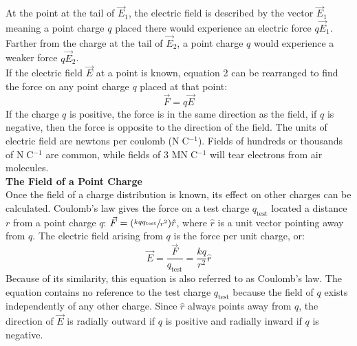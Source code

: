 \documentclass[a4paper]{article}
\let\bf\textbf
\begin{document}
At the point at the tail of $\vec{E}_1$, the electric field is described by the vector $\vec{E}_1$ meaning a point charge $q$ placed there would experience an electric force $q\vec{E}_1$. Farther from the charge at the tail of $\vec{E}_2$, a point charge $q$ would experience a weaker force $q\vec{E}_2$.
\vspace{1mm}\\
If the electric field $\vec{E}$ at a point is known, equation 2 can be rearranged to find the force on any point charge $q$ placed at that point:
\begin{equation*}
    \vec{F} = q\vec{E}
\end{equation*}
If the charge $q$ is positive, the force is in the same direction as the field, if $q$ is negative, then the force is opposite to the direction of the field. The units of electric field are newtons per coulomb (N$\;$C$^{-1}$). Fields of hundreds or thousands of N$\;$C$^{-1}$ are common, while fields of 3 MN$\;$C$^{-1}$ will tear electrons from air molecules.
\vspace{1mm}\\
\bf{The Field of a Point Charge}
\vspace{1mm}\\
Once the field of a charge distribution is known, its effect on other charges can be calculated. Coulomb's law gives the force on a test charge $q_{\text{test}}$ located a distance $r$ from a point charge $q$: $\vec{F} = (\sfrac{kqq_{\text{test}}}{r^2})\hat{r}$, where $\hat{r}$ is a unit vector pointing away from $q$. The electric field arising from $q$ is the force per unit charge, or:
\begin{equation}
    \vec{E} = \frac{\vec{F}}{q_{\text{test}}} = \frac{kq}{r^2}\hat{r}
\end{equation}
Because of its similarity, this equation is also referred to as Coulomb's law. The equation contains no reference to the test charge $q_{\text{test}}$ because the field of $q$ exists independently of any other charge. Since $\hat{r}$ always points away from $q$, the direction of $\vec{E}$ is radially outward if $q$ is positive and radially inward if $q$ is negative.
\begin{center}
\end{center}
\end{document}
